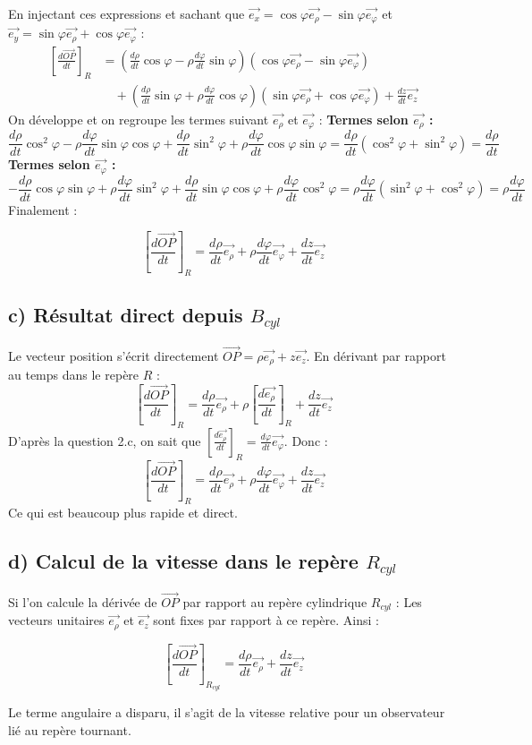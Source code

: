 \documentclass[11pt,a4paper]{article}
\begin{document}
En injectant ces expressions et sachant que $\vec{e_x} = \cos\varphi \vec{e_\rho} - \sin\varphi \vec{e_\varphi}$ et $\vec{e_y} = \sin\varphi \vec{e_\rho} + \cos\varphi \vec{e_\varphi}$ :
\begin{align*}
\left[\frac{d\vec{OP}}{dt}\right]_R &= \left(\frac{d\rho}{dt} \cos\varphi - \rho \frac{d\varphi}{dt} \sin\varphi\right)(\cos\varphi \vec{e_\rho} - \sin\varphi \vec{e_\varphi}) \\
&\quad + \left(\frac{d\rho}{dt} \sin\varphi + \rho \frac{d\varphi}{dt} \cos\varphi\right)(\sin\varphi \vec{e_\rho} + \cos\varphi \vec{e_\varphi}) + \frac{dz}{dt} \vec{e_z}
\end{align*}
On développe et on regroupe les termes suivant $\vec{e_\rho}$ et $\vec{e_\varphi}$ :
\textbf{Termes selon $\vec{e_\rho}$ :}
$$ \frac{d\rho}{dt} \cos^2\varphi - \rho \frac{d\varphi}{dt} \sin\varphi \cos\varphi + \frac{d\rho}{dt} \sin^2\varphi + \rho \frac{d\varphi}{dt} \cos\varphi \sin\varphi = \frac{d\rho}{dt}(\cos^2\varphi + \sin^2\varphi) = \frac{d\rho}{dt} $$
\textbf{Termes selon $\vec{e_\varphi}$ :}
$$ -\frac{d\rho}{dt} \cos\varphi \sin\varphi + \rho \frac{d\varphi}{dt} \sin^2\varphi + \frac{d\rho}{dt} \sin\varphi \cos\varphi + \rho \frac{d\varphi}{dt} \cos^2\varphi = \rho \frac{d\varphi}{dt}(\sin^2\varphi + \cos^2\varphi) = \rho \frac{d\varphi}{dt} $$
Finalement :
\begin{sonucbox}
$$ \left[\frac{d\vec{OP}}{dt}\right]_R = \frac{d\rho}{dt} \vec{e_\rho} + \rho \frac{d\varphi}{dt} \vec{e_\varphi} + \frac{dz}{dt} \vec{e_z} $$
\end{sonucbox}

\subsection*{c) Résultat direct depuis $B_{cyl}$}
Le vecteur position s'écrit directement $\vec{OP} = \rho \vec{e_\rho} + z \vec{e_z}$.
En dérivant par rapport au temps dans le repère $R$ :
$$ \left[\frac{d\vec{OP}}{dt}\right]_R = \frac{d\rho}{dt} \vec{e_\rho} + \rho \left[\frac{d\vec{e_\rho}}{dt}\right]_R + \frac{dz}{dt} \vec{e_z} $$
D'après la question 2.c, on sait que $\left[\frac{d\vec{e_\rho}}{dt}\right]_R = \frac{d\varphi}{dt} \vec{e_\varphi}$. Donc :
$$ \left[\frac{d\vec{OP}}{dt}\right]_R = \frac{d\rho}{dt} \vec{e_\rho} + \rho \frac{d\varphi}{dt} \vec{e_\varphi} + \frac{dz}{dt} \vec{e_z} $$
Ce qui est beaucoup plus rapide et direct.

\subsection*{d) Calcul de la vitesse dans le repère $R_{cyl}$}
Si l'on calcule la dérivée de $\vec{OP}$ par rapport au repère cylindrique $R_{cyl}$ :
Les vecteurs unitaires $\vec{e_\rho}$ et $\vec{e_z}$ sont fixes par rapport à ce repère. Ainsi :
\begin{sonucbox}
$$ \left[\frac{d\vec{OP}}{dt}\right]_{R_{cyl}} = \frac{d\rho}{dt} \vec{e_\rho} + \frac{dz}{dt} \vec{e_z} $$
\end{sonucbox}
Le terme angulaire a disparu, il s'agit de la vitesse relative pour un observateur lié au repère tournant.
\end{document}
